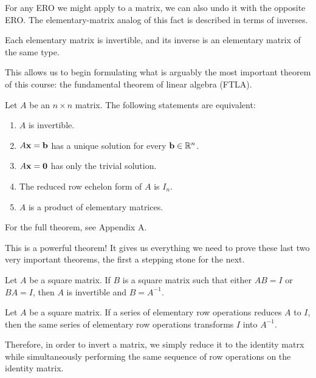 \documentclass[../m073main.tex]{subfiles}
\begin{document}
For any ERO we might apply to a matrix, we can also undo it with the opposite ERO.
The elementary-matrix analog of this fact is described in terms of inverses.

\begin{theorem}
	Each elementary matrix is invertible, and its inverse is an elementary matrix of the same type.
\end{theorem}

This allows us to begin formulating what is arguably the most important theorem of this course: the fundamental theorem of linear algebra (FTLA).

\begin{theorem}
	Let $A$ be an $n\times n$ matrix.
	The following statements are equivalent:
	\begin{enumerate}[label=(\alph*)]
		\item $A$ is invertible.
		\item $A\mathbf{x}= \mathbf{b}$ has a unique solution for every $\mathbf{b}\in\mathbb{R}^n$.
		\item $A\mathbf{x}=\mathbf{0}$ has only the trivial solution.
		\item The reduced row echelon form of $A$ is $I_n$.
		\item $A$ is a product of elementary matrices.
	\end{enumerate}
	For the full theorem, see Appendix A.
\end{theorem}

This is a powerful theorem!
It gives us everything we need to prove these last two very important theorems, the first a stepping stone for the next.

\begin{theorem}
	Let $A$ be a square matrix.
	If $B$ is a square matrix such that either $AB = I$ or $BA = I$, then $A$ is invertible and $B = A^{-1}$.
\end{theorem}

\begin{theorem}
	Let $A$ be a square matrix.
	If a series of elementary row operations reduces $A$ to $I$, then the same series of elementary row operations transforms $I$ into $A^{-1}$.
\end{theorem}

Therefore, in order to invert a matrix, we simply reduce it to the identity matrx while simultaneously performing the same sequence of row operations on the identity matrix.
\end{document}
